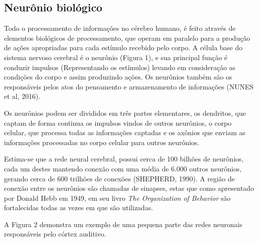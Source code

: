 \subsection{Neurônio biológico}


Todo o processamento de informações no cérebro humano, é feito através de elementos biológicos de processamento, que operam em paralelo para a produção de ações apropriadas para cada estímulo recebido pelo corpo. A célula base do sistema nervoso cerebral é o neurônio (Figura 1), e sua principal função é conduzir impulsos (Representando os estímulos) levando em consideração as condições do corpo e assim produzindo ações. Os neurônios também são os responsáveis pelos atos do pensamento e armazenamento de informações (NUNES et al, 2016).

Os neurônios podem ser divididos em três partes elementares, os dendritos, que captam de forma continua os impulsos vindos de outros neurônios, o corpo celular, que processa todas as informações captadas e os axônios que enviam as informações processadas no corpo celular para outros neurônios.


Estima-se que a rede neural cerebral, possui cerca de 100 bilhões de neurônios, cada um destes mantendo conexão com uma média de 6.000 outros neurônios, gerando cerca de 600 trilhões de conexões (SHEPHERD, 1990). A região de conexão entre os neurônios são chamadas de sinapses, estas que como apresentado por Donald Hebb em 1949, em seu livro \textit{The Organization of Behavior} são fortalecidas todas as vezes em que são utilizadas.


A Figura 2 demonstra um exemplo de uma pequena parte das redes neuronais responsáveis pelo córtex auditivo.

